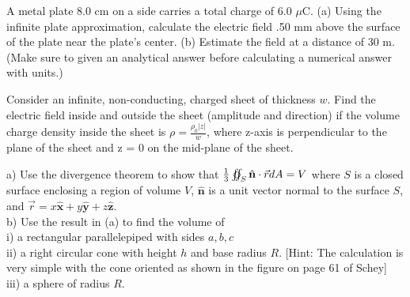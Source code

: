 \documentclass[11pt,letterpaper,boxed]{hmcpset}
\begin{document}
	\begin{problem}[HRK E27.29]
A metal plate 8.0 cm on a side carries a total charge of 6.0 $\mu$C. (a) Using the infinite plate approximation, calculate the electric field .50 mm above the surface of the plate near the plate's center. (b) Estimate the field at a distance of 30 m.
(Make sure to given an analytical answer before calculating a numerical answer with units.)
		
	\end{problem}
	
	\begin{solution}
		\vfill
	\end{solution}
	\newpage	
	
	\begin{problem}Consider an infinite, non-conducting, charged sheet of thickness $w$. Find the electric field inside and outside the sheet (amplitude and direction) if the volume charge density inside the sheet is $\rho = \frac{\rho_0|z|}{w}$, where z-axis is perpendicular to the plane of the sheet and z = 0 on the mid-plane
of the sheet.
	\end{problem}
	
	\begin{solution}
		\vfill
	\end{solution}
	\newpage
	
	\begin{problem}[Schey: II-26]
a) Use the divergence theorem to show that $\frac{1}{3} \varoiint_S \hat{\mathbf{n}} \cdot \vec{r} dA = V$ where $S$ is a closed surface enclosing a region of volume $V$, $\hat{\mathbf{n}}$ is a unit vector normal to the surface $S$, and $\vec{r} = x\hat{\mathbf{x}} + y\hat{\mathbf{y}} + z\hat{\mathbf{z}}$.\\
b) Use the result in (a) to find the volume of \\
i) a rectangular parallelepiped with sides $a, b, c$ \\
ii) a right circular cone with height $h$ and base radius $R$. [Hint: The calculation is very simple
with the cone oriented as shown in the figure on page 61 of Schey] \\
iii) a sphere of radius $R$.

		
	\end{problem}
	
	\begin{solution}
		\vfill
	\end{solution}
	\newpage
	
\end{document}
